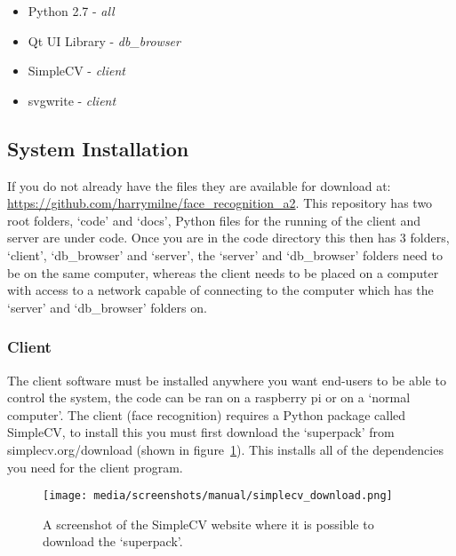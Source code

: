 \documentclass[12pt,a4paper]{report}
\begin{document}
            \begin{itemize}
                \item Python 2.7 - \textit{all}
                \item Qt UI Library - \textit{db\_browser}
                \item SimpleCV - \textit{client}
                \item svgwrite - \textit{client}
            \end{itemize}

    \subsection{System Installation}
        If you do not already have the files they are available for download at: \url{https://github.com/harrymilne/face_recognition_a2}.
        This repository has two root folders, `code' and `docs', Python files for the running of the client and server are under code.
        Once you are in the code directory this then has 3 folders, `client', `db\_browser' and `server', the `server' and `db\_browser'
        folders need to be on the same computer, whereas the client needs to be placed on a computer with access to a network capable of
        connecting to the computer which has the `server' and `db\_browser' folders on. 

    \subsubsection{Client}
        The client software must be installed anywhere you want end-users to be able to control the system, the code can be ran on a 
        raspberry pi or on a `normal computer'. 
        The client (face recognition) requires a Python package called SimpleCV, to install this you must first 
        download the `superpack' from simplecv.org/download (shown in figure~\ref{fig:simplecv}).  This installs all of the dependencies 
        you need for the client program.

        \begin{figure}[H]
            \centering
            \caption{A screenshot of the SimpleCV website where it is possible to download the `superpack'.}
            \label{fig:simplecv}
                \texttt{[image: media/screenshots/manual/simplecv\_download.png]}
        \end{figure}
\end{document}
